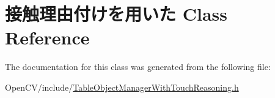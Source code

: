\hypertarget{class_xE6_x8E_xA5_xE8_xA7_xA6_xE7_x90_x86_xE7_x94_xB1_xE4_xBB_x98_xE3_x81_x91_xE3_x82_x92_xE7_x94_xA8_xE3_x81_x84_xE3_x81_x9F}{}\section{接触理由付けを用いた Class Reference}
\label{class_xE6_x8E_xA5_xE8_xA7_xA6_xE7_x90_x86_xE7_x94_xB1_xE4_xBB_x98_xE3_x81_x91_xE3_x82_x92_xE7_x94_xA8_xE3_x81_x84_xE3_x81_x9F}


The documentation for this class was generated from the following file\+:\begin{DoxyCompactItemize}
\item 
Open\+C\+V/include/\hyperlink{_table_object_manager_with_touch_reasoning_8h}{Table\+Object\+Manager\+With\+Touch\+Reasoning.\+h}\end{DoxyCompactItemize}
